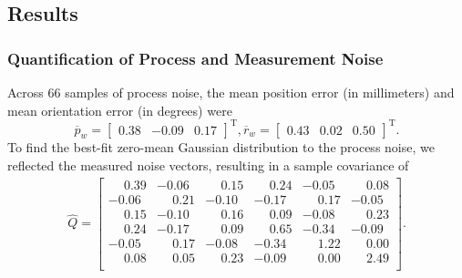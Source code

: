 \subsection{Results}
\subsubsection{Quantification of Process and Measurement Noise}
Across 66 samples of process noise, the mean position error (in millimeters) and mean orientation error (in degrees) were \[{\overline{p}_{w}} = \begin{bmatrix} 0.38 &-0.09 &0.17 \end{bmatrix}^{\text{T}}, {\overline{r}_{w}} = \begin{bmatrix} 0.43 &0.02 &0.50 \end{bmatrix}^{\text{T}}.\] To find the best-fit zero-mean Gaussian distribution to the process noise, we reflected the measured noise vectors, resulting in a sample covariance of
\begin{align*}
{\hat{Q}} = \begin{bmatrix} 
\phantom{-}0.39 	& -0.06 	& \phantom{-}0.15 		& \phantom{-}0.24 		& -0.05 	& \phantom{-}0.08\\ 
-0.06 			& \phantom{-}0.21  	& -0.10   	& -0.17 	& \phantom{-}0.17 		& -0.05\\
\phantom{-}0.15 	& -0.10 	& \phantom{-}0.16    	& \phantom{-}0.09 		& -0.08 	& \phantom{-}0.23\\
\phantom{-}0.24 	& -0.17 	& \phantom{-}0.09  	& \phantom{-}0.65 		& -0.34 	& -0.09\\
-0.05 	& \phantom{-}0.17		& -0.08 	& -0.34 	& \phantom{-}1.22		& \phantom{-}0.00\\
\phantom{-}0.08 	& \phantom{-}0.05		& \phantom{-}0.23  	& -0.09 	& \phantom{-}0.00 	& \phantom{-}2.49\\
\end{bmatrix}.
\end{align*}

